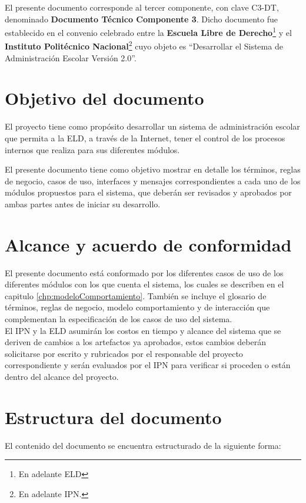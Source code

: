 \label{sec:introduccion}


El presente documento corresponde al tercer componente, con clave C3-DT, denominado {\bf Documento Técnico Componente 3}. Dicho documento fue establecido en el convenio celebrado entre la {\bf Escuela Libre de Derecho}\footnote{En adelante ELD} y el {\bf Instituto Politécnico Nacional}\footnote{En adelante IPN.} cuyo objeto es ``Desarrollar el Sistema de Administración Escolar Versión 2.0''.



\section{Objetivo del documento}
\label{gls:Objetivo del documento}

El proyecto tiene como propósito desarrollar un sistema de administración escolar que permita a la ELD, a través de la Internet, tener el control de los procesos internos que realiza para sus diferentes módulos.

El presente documento tiene como objetivo mostrar en detalle los términos, reglas de negocio, casos de uso, interfaces y mensajes correspondientes a cada uno de los módulos propuestos para el sistema, que deberán ser revisados y aprobados por ambas partes antes de iniciar su desarrollo.

\section{Alcance y acuerdo de conformidad}
\label{gls:Alcance y acuerdo de conformidad}


El presente documento está conformado por los diferentes casos de uso de los diferentes módulos con los que cuenta el sistema, los cuales se describen en el capitulo \ref{chp:modeloComportamiento}. También se incluye el glosario de términos, reglas de negocio, modelo comportamiento y de interacción que complementan la especificación de los casos de uso del sistema.\\

El IPN y la ELD asumirán los costos en tiempo y alcance del sistema que se deriven de cambios a los artefactos ya aprobados, estos cambios deberán solicitarse por escrito y rubricados por el responsable del proyecto correspondiente y serán evaluados por el IPN para verificar si proceden o están dentro del alcance del proyecto.

\section{Estructura del documento}
\label{gls:Estructura del documento}
El contenido del documento se encuentra estructurado de la siguiente forma:\\

